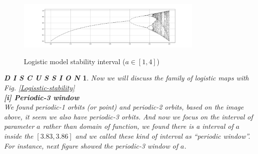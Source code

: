 \documentclass[12pt]{article}
\theoremstyle{plain}
\newtheorem{discussion}{\textit{D I S C U S S I O N}}[section]
\begin{document}
\begin{figure}[H]
\begin{center}
\includegraphics[width=0.8\textwidth]{figure/section1/logistic-stability.png} \\
\caption{Logistic model stability interval ($a \in [1, 4]$)}\label{Logistic-stability}
\end{center}
\end{figure}




\newpage
\begin{discussion} Now we will discuss the family of logistic maps with Fig. \ref{Logisstic-stability}
\\\noindent \textbf{[i] Periodic-3 window}
\\\noindent We found periodic-1 orbits (or point) and periodic-2 orbits, based on the image above, it seem we also have periodic-3 orbits. And now we focus on the interval of parameter $a$ rather than domain of function, we found there is a interval of $a$ inside the $[3.83, 3.86]$ and we called these kind of interval as ``periodic window''. For instance, next figure showed the periodic-3 window of $a$.


\end{discussion}
\end{document}
